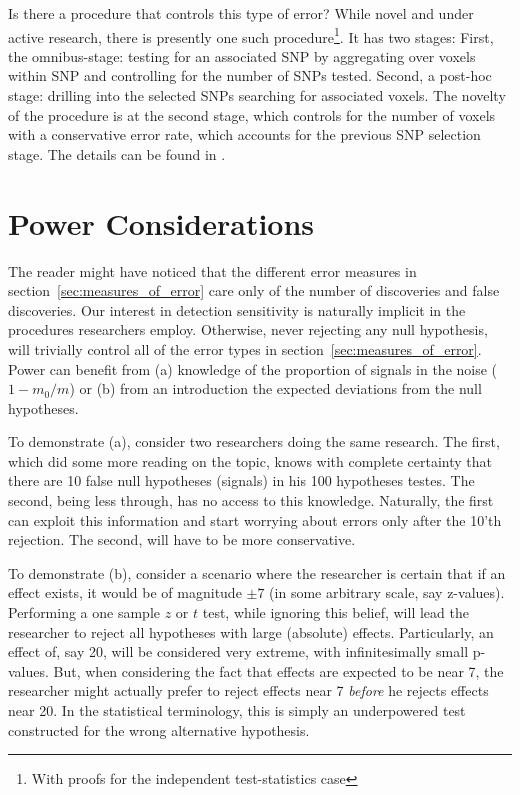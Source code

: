 \documentclass[review,12pt]{article}
\begin{document}
Is there a procedure that controls this type of error? While novel and under active research, there is presently one such procedure\footnote{ With proofs for the independent test-statistics case}. It has two stages: 
First, the omnibus-stage:  testing for an associated SNP by aggregating over voxels within SNP and controlling for the number of SNPs tested. Second, a post-hoc stage: drilling into the selected SNPs searching for associated voxels. The novelty of the procedure is at the second stage, which controls for the number of voxels with a conservative error rate, which accounts for the previous SNP selection stage. 
The details can be found in \cite{benjamini_adjusting_2013}.




\section{\label{sec:power}Power Considerations}

The reader might have noticed that the different error measures in section~\ref{sec:measures_of_error} care only of the number of discoveries and false discoveries. Our interest in detection sensitivity is naturally implicit in the procedures researchers employ. Otherwise, never rejecting any null hypothesis, will trivially control all of the error types in section~\ref{sec:measures_of_error}. 
Power can benefit from (a) knowledge of the proportion of signals in the noise ($ 1 - m_0 / m $) or (b) from an introduction the expected deviations from the null hypotheses. 

To demonstrate (a), consider two researchers doing the same research. The first, which did some more reading on the topic, knows with complete certainty that there are 10 false null hypotheses (signals) in his 100 hypotheses testes. The second, being less through, has no access to this knowledge. Naturally, the first can exploit this information and start worrying about errors only after the 10'th rejection. The second, will have to be more conservative.

To demonstrate (b), consider a scenario where the researcher is certain that if an effect exists, it would be of magnitude $\pm 7$ (in some arbitrary scale, say z-values). Performing a one sample $z$ or $t$ test, while ignoring this belief, will lead the researcher to reject all hypotheses with large (absolute) effects. Particularly, an effect of, say 20,  will be considered very extreme, with infinitesimally small p-values. But, when considering the fact that effects are expected to be near 7, the researcher might actually prefer to reject effects near 7 \emph{before} he rejects effects near 20. In the statistical terminology, this is simply an underpowered test constructed for the wrong alternative hypothesis. 
\end{document}
